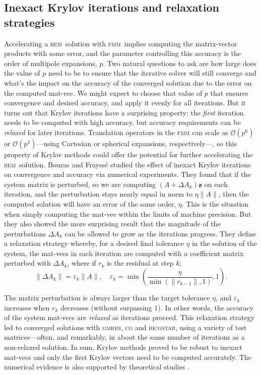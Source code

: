 \documentclass[final,3p,times]{elsarticle}
\newcommand{\bem}{\textsc{bem}\xspace}
\newcommand{\fmm}{\textsc{fmm}\xspace}
\renewcommand{\O}[1]{\mathcal{O}(#1)}
\newcommand{\gmres}{\textsc{gmres}\xspace}
\newcommand{\vect}[1]{\mathbf{#1}}
\begin{document}
\subsection{Inexact Krylov iterations and relaxation strategies}

Accelerating a \bem\ solution with \fmm\ implies computing the matrix-vector products with some error, and the parameter controlling this accuracy is the order of multipole expansions, $p$. 
Two natural questions to ask are how large does the value of $p$ need to be to ensure that the iterative solver will still converge and what's the impact on the accuracy of the converged solution due to the error on the computed mat-vec.
We might expect to choose that value of $p$ that ensures convergence and desired accuracy, and apply it evenly for all iterations. 
But it turns out that Krylov iterations have a surprising property: the \emph{first} iteration needs to be computed with high accuracy, but accuracy requirements can be \emph{relaxed} for later iterations. 
Translation operators in the \fmm can scale as $\O{p^{6}}$ or $\O{p^{4}}$---using Cartesian or spherical expansions, respectively---, so this property of Krylov methods could offer the potential for further accelerating the \bem\ solution.
Bouras and Frayss{\'e} \cite{bouras2000relaxation,bourasfraysse2005} studied the effect of inexact Krylov iterations on convergence and accuracy via numerical experiments.
They found that if the system matrix is perturbed, so we are computing $(A+\Delta A_k)\vect{z}$ on each iteration, and the perturbation stays nearly equal in norm to $\eta \|A\|$, then the computed solution will have an error of the same order, $\eta$. This is the situation when simply computing the mat-vec within the limits of machine precision. But they also showed the more surprising result that the magnitude of the perturbations $\Delta A_k$ can be allowed to grow as the iterations progress.
They define a relaxation strategy whereby, for a desired final tolerance $\eta$ in the solution of the system, the mat-vecs in each iteration are computed with a coefficient matrix perturbed with $\Delta A_k$, where if $r_k$ is the residual at step $k$,
%
\begin{equation}\label{eqn:matrix-perturbation}
  \|\Delta A_k\| = \varepsilon_k\|A\|, \quad \varepsilon_k=\min\left( \frac{\eta}{\min(\|r_{k-1}\|,1)}, 1\right).
\end{equation}

\noindent The matrix perturbation is always larger than the target tolerance $\eta$, and $\varepsilon_k$ increases when $r_k$ decreases (without surpassing $1$). In other words, the accuracy of the system mat-vecs are \emph{relaxed} as iterations proceed. This relaxation strategy led to converged solutions with \gmres, \textsc{cg} and \textsc{bicgstab}, using a variety of test matrices---often, and remarkably, in about the same number of iterations as a non-relaxed solution. In sum, Krylov methods proved to be robust to inexact mat-vecs and only the first Krylov vectors need to be computed accurately.
The numerical evidence is also supported by theoretical studies \cite{simonciniszyld2003,vandeneshofsleijpen2004}.
\end{document}
